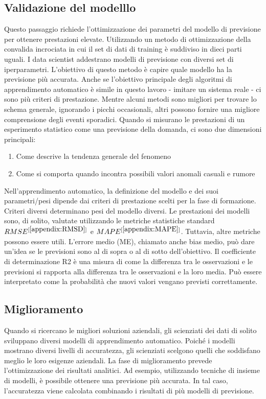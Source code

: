 \documentclass[12pt,a4paper]{report}
\begin{document}
\subsection{Validazione del modelllo}
Questo passaggio richiede l'ottimizzazione dei parametri del modello di previsione per ottenere prestazioni elevate. Utilizzando un metodo di ottimizzazione della convalida incrociata in cui il set di dati di training è suddiviso in dieci parti uguali. I data scientist addestrano modelli di previsione con diversi set di iperparametri. L'obiettivo di questo metodo è capire quale modello ha la previsione più accurata.
Anche se l'obiettivo principale degli algoritmi di apprendimento automatico è simile in questo lavoro - imitare un sistema reale - ci sono più criteri di prestazione. Mentre alcuni metodi sono migliori per trovare lo schema generale, ignorando i picchi occasionali, altri possono fornire una migliore comprensione degli eventi sporadici. Quando si misurano le prestazioni di un esperimento statistico come una previsione della domanda, ci sono due dimensioni principali:
\begin{enumerate}
    \item Come descrive la tendenza generale del fenomeno
    \item Come si comporta quando incontra possibili valori anomali casuali e rumore
\end{enumerate}

Nell'apprendimento automatico, la definizione del modello e dei suoi parametri/pesi dipende dai criteri di prestazione scelti per la fase di formazione. Criteri diversi determinano pesi del modello diversi.
Le prestazioni dei modelli sono, di solito, valutate utilizzando le metriche statistiche standard $RMSE^{[\ref{appendix:RMSD}]}$ e $MAPE^{[\ref{appendix:MAPE}]}$. Tuttavia, altre metriche possono essere utili. L'errore medio (ME), chiamato anche bias medio, può dare un'idea se le previsioni sono al di sopra o al di sotto dell'obiettivo. Il coefficiente di determinazione R2 è una misura di come la differenza tra le osservazioni e le previsioni si rapporta alla differenza tra le osservazioni e la loro media. Può essere interpretato come la probabilità che nuovi valori vengano previsti correttamente.


\subsection{Miglioramento}
Quando si ricercano le migliori soluzioni aziendali, gli scienziati dei dati di solito sviluppano diversi modelli di apprendimento automatico. Poiché i modelli mostrano diversi livelli di accuratezza, gli scienziati scelgono quelli che soddisfano meglio le loro esigenze aziendali. La fase di miglioramento prevede l'ottimizzazione dei risultati analitici. Ad esempio, utilizzando tecniche di insieme di modelli, è possibile ottenere una previsione più accurata. In tal caso, l'accuratezza viene calcolata combinando i risultati di più modelli di previsione.
\end{document}
